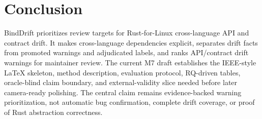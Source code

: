 \section{Conclusion}

BindDrift prioritizes review targets for Rust-for-Linux cross-language API and
contract drift. It makes cross-language dependencies explicit, separates drift
facts from promoted warnings and adjudicated labels, and ranks API/contract
drift warnings for maintainer review. The current M7 draft establishes the
IEEE-style LaTeX skeleton, method description, evaluation protocol, RQ-driven
tables, oracle-blind claim boundary, and external-validity slice needed before
later camera-ready polishing. The central claim remains evidence-backed warning
prioritization, not automatic bug confirmation, complete drift coverage, or
proof of Rust abstraction correctness.
